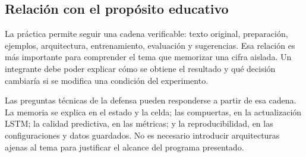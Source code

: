 \subsection{Relación con el propósito educativo}
La práctica permite seguir una cadena verificable: texto original, preparación, ejemplos, arquitectura, entrenamiento, evaluación y sugerencias. Esa relación es más importante para comprender el tema que memorizar una cifra aislada. Un integrante debe poder explicar cómo se obtiene el resultado y qué decisión cambiaría si se modifica una condición del experimento.

Las preguntas técnicas de la defensa pueden responderse a partir de esa cadena. La memoria se explica en el estado y la celda; las compuertas, en la actualización LSTM; la calidad predictiva, en las métricas; y la reproducibilidad, en las configuraciones y datos guardados. No es necesario introducir arquitecturas ajenas al tema para justificar el alcance del programa presentado.
